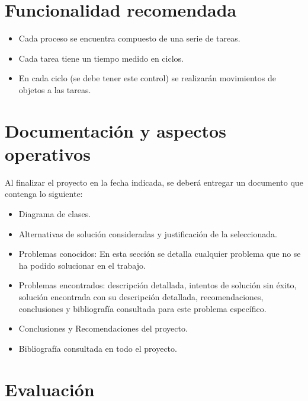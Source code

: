 \documentclass[12pt,letterpaper]{article}
\begin{document}
\section*{Funcionalidad recomendada}

\begin{itemize}
    \item Cada proceso se encuentra compuesto de una serie de tareas.
    \item Cada tarea tiene un tiempo medido en ciclos.
    \item En cada ciclo (se debe tener este control) se realizarán movimientos de objetos a las tareas.
\end{itemize}

\section*{Documentación y aspectos operativos}

Al finalizar el proyecto en la fecha indicada, se deberá entregar un documento que contenga lo siguiente:

\begin{itemize}
    \item[\checkmark] Diagrama de clases.
    \item[\checkmark] Alternativas de solución consideradas y justificación de la seleccionada.
    \item[\checkmark] Problemas conocidos: En esta sección se detalla cualquier problema que no se ha podido solucionar en el trabajo.
    \item[\checkmark] Problemas encontrados: descripción detallada, intentos de solución sin éxito, solución encontrada con su descripción detallada, recomendaciones, conclusiones y bibliografía consultada para este problema específico.
    \item[\checkmark] Conclusiones y Recomendaciones del proyecto.
    \item[\checkmark] Bibliografía consultada en todo el proyecto.
\end{itemize}

\section*{Evaluación}
\end{document}
